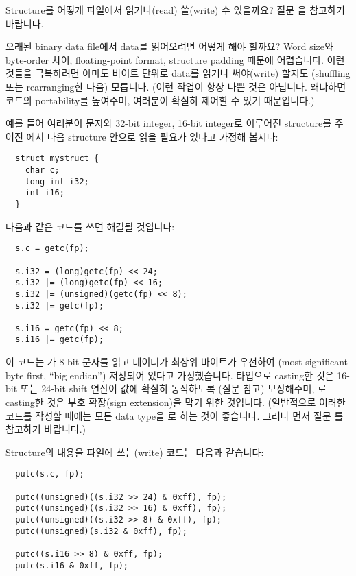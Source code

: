 \begin{faq}
	Structure를 어떻게 파일에서 읽거나(read) 쓸(write) 수 있을까요?
\A
	질문 을 참고하기 바랍니다.
\end{faq}

\begin{faq}
	오래된 binary data file에서 data를 읽어오려면 어떻게 해야 할까요?
\A
	Word size와 byte-order 차이, floating-point format, structure padding
	때문에 어렵습니다.  이런 것들을 극복하려면 아마도 바이트 단위로
	data를 읽거나 써야(write) 할지도 (shuffling 또는 rearranging한 다음)
	모릅니다. (이런 작업이 항상 나쁜 것은 아닙니다. 왜냐하면 코드의
	portability를 높여주며, 여러분이 확실히 제어할 수 있기 때문입니다.)

	예를 들어 여러분이 문자와 32-bit integer, 16-bit integer로 이루어진
	structure를 주어진 에서 다음 structure 안으로 
	읽을 필요가 있다고 가정해 봅시다:

\begin{verbatim}
  struct mystruct {
    char c;
    long int i32;
    int i16;
  }
\end{verbatim}

	다음과 같은 코드를 쓰면 해결될 것입니다:

\begin{verbatim}
  s.c = getc(fp);

  s.i32 = (long)getc(fp) << 24;
  s.i32 |= (long)getc(fp) << 16;
  s.i32 |= (unsigned)(getc(fp) << 8);
  s.i32 |= getc(fp);

  s.i16 = getc(fp) << 8;
  s.i16 |= getc(fp);
\end{verbatim}

	이 코드는 가 8-bit 문자를 읽고 데이터가 최상위 바이트가
	우선하여 (most significant byte first, ``big endian'') 저장되어
	있다고 가정했습니다.   타입으로 casting한 것은
	16-bit 또는 24-bit shift 연산이  값에 확실히 동작하도록
	(질문  참고) 보장해주며, 로 casting한 것은
	부호 확장(sign extension)을 막기 위한 것입니다.
	(일반적으로 이러한 코드를 작성할 때에는 모든 data type을 
	로 하는 것이 좋습니다.  그러나 먼저 질문 를
	참고하기 바랍니다.)

	Structure의 내용을 파일에 쓰는(write) 코드는 다음과 같습니다:

\begin{verbatim}
  putc(s.c, fp);

  putc((unsigned)((s.i32 >> 24) & 0xff), fp);
  putc((unsinged)((s.i32 >> 16) & 0xff), fp);
  putc((unsigned)((s.i32 >> 8) & 0xff), fp);
  putc((unsigned)(s.i32 & 0xff), fp);

  putc((s.i16 >> 8) & 0xff, fp);
  putc(s.i16 & 0xff, fp);
\end{verbatim}

\end{faq}

%
%
